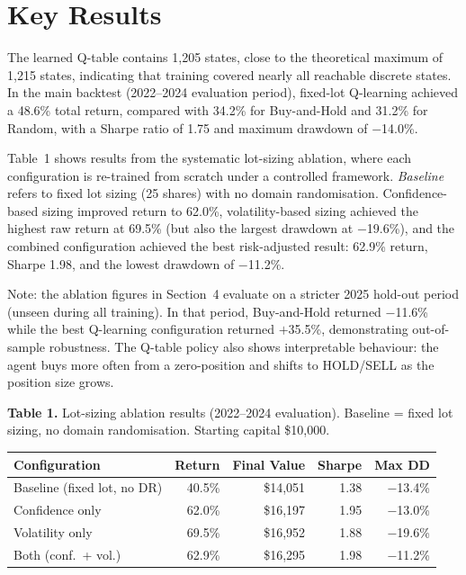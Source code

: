 \documentclass[10pt]{article}
\begin{document}
\section{Key Results}

The learned Q-table contains 1,205 states, close to the theoretical maximum of 1,215 states, indicating that training covered nearly all reachable discrete states. In the main backtest (2022--2024 evaluation period), fixed-lot Q-learning achieved a 48.6\% total return, compared with 34.2\% for Buy-and-Hold and 31.2\% for Random, with a Sharpe ratio of 1.75 and maximum drawdown of $-$14.0\%.

Table~1 shows results from the systematic lot-sizing ablation, where each configuration is re-trained from scratch under a controlled framework. \textit{Baseline} refers to fixed lot sizing (25 shares) with no domain randomisation. Confidence-based sizing improved return to 62.0\%, volatility-based sizing achieved the highest raw return at 69.5\% (but also the largest drawdown at $-$19.6\%), and the combined configuration achieved the best risk-adjusted result: 62.9\% return, Sharpe 1.98, and the lowest drawdown of $-$11.2\%.

Note: the ablation figures in Section~4 evaluate on a stricter 2025 hold-out period (unseen during all training). In that period, Buy-and-Hold returned $-$11.6\% while the best Q-learning configuration returned $+$35.5\%, demonstrating out-of-sample robustness. The Q-table policy also shows interpretable behaviour: the agent buys more often from a zero-position and shifts to HOLD/SELL as the position size grows.

\begin{center}
\small
\textbf{Table 1.} Lot-sizing ablation results (2022--2024 evaluation). Baseline = fixed lot sizing, no domain randomisation. Starting capital \$10,000.\\[0.4em]
\begin{tabular}{lrrrr}
\toprule
\textbf{Configuration} & \textbf{Return} & \textbf{Final Value} & \textbf{Sharpe} & \textbf{Max DD} \\
\midrule
Baseline (fixed lot, no DR)  & 40.5\% & \$14,051 & 1.38 & $-$13.4\% \\
Confidence only              & 62.0\% & \$16,197 & 1.95 & $-$13.0\% \\
Volatility only              & 69.5\% & \$16,952 & 1.88 & $-$19.6\% \\
Both (conf.\ + vol.)         & 62.9\% & \$16,295 & 1.98 & $-$11.2\% \\
\bottomrule
\end{tabular}
\end{center}
\end{document}
